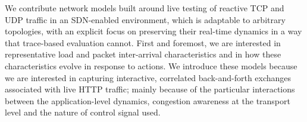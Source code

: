 \documentclass[10pt, times, conference, letterpaper]{IEEEtran}
\begin{document}
We contribute network models built around live testing of reactive TCP and UDP traffic in an SDN-enabled environment, which is adaptable to arbitrary topologies, with an explicit focus on preserving their real-time dynamics in a way that trace-based evaluation cannot.
First and foremost, we are interested in representative load and packet inter-arrival characteristics and in how these characteristics evolve in response to actions.
We introduce these models because we are interested in capturing interactive, correlated back-and-forth exchanges associated with live HTTP traffic; mainly because of the particular interactions between the application-level dynamics, congestion awareness at the transport level and the nature of control signal used.



\end{document}
